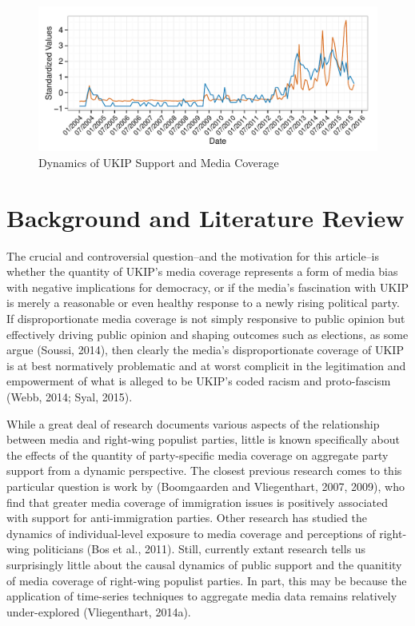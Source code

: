 \documentclass[12pt,article]{article}
\begin{document}
\begin{figure}[htbp]
\centering
\includegraphics{ukip_media_files/figure-latex/unnamed-chunk-2-1.pdf}
\caption{Dynamics of UKIP Support and Media Coverage}
\end{figure}

\section{Background and Literature
Review}\label{background-and-literature-review}

The crucial and controversial question--and the motivation for this
article--is whether the quantity of UKIP's media coverage represents a
form of media bias with negative implications for democracy, or if the
media's fascination with UKIP is merely a reasonable or even healthy
response to a newly rising political party. If disproportionate media
coverage is not simply responsive to public opinion but effectively
driving public opinion and shaping outcomes such as elections, as some
argue (Soussi, 2014), then clearly the media's disproportionate coverage
of UKIP is at best normatively problematic and at worst complicit in the
legitimation and empowerment of what is alleged to be UKIP's coded
racism and proto-fascism (Webb, 2014; Syal, 2015).

While a great deal of research documents various aspects of the
relationship between media and right-wing populist parties, little is
known specifically about the effects of the quantity of party-specific
media coverage on aggregate party support from a dynamic perspective.
The closest previous research comes to this particular question is work
by (Boomgaarden and Vliegenthart, 2007, 2009), who find that greater
media coverage of immigration issues is positively associated with
support for anti-immigration parties. Other research has studied the
dynamics of individual-level exposure to media coverage and perceptions
of right-wing politicians (Bos et al., 2011). Still, currently extant
research tells us surprisingly little about the causal dynamics of
public support and the quanitity of media coverage of right-wing
populist parties. In part, this may be because the application of
time-series techniques to aggregate media data remains relatively
under-explored (Vliegenthart, 2014a).
\end{document}

